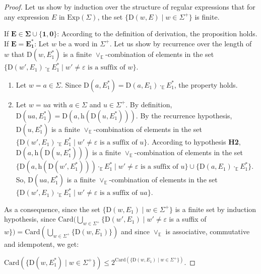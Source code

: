 \documentclass{article}
\begin{document}
  \begin{proof}  
    Let us show by induction over the structure of regular expressions that for any expression $E$ in $\mathrm{Exp}(\Sigma)$, the set $\{\mathrm{D}(w,E)\mid w\in\Sigma^{+}\}$ is finite.
    
    
     If  $\mathbf{E\in\Sigma\cup\{1,0\}}$:      
        According to the definition of derivation, the proposition holds. \\
           
           
       If $\mathbf{E=E_1^{*}}$:
        Let $w$ be a word in $\Sigma^{+}$. 
        Let us show by recurrence over the length of $w$ that $\mathrm{D}(w,E_1^{*})$ is a finite $\vee_{\mathbb{E}}$-combination of elements in the set $\{\mathrm{D}(w',E_1) \cdot_{\mathbb{E}} E_1^* \mid w'\neq\varepsilon\text{ is a suffix of }w\}$.
          \begin{enumerate}
            \item Let $w=a\in\Sigma$. Since $\mathrm{D}(a,E_1^{*})=\mathrm{D}(a,E_1) \cdot_{\mathbb{E}} E_1^*$, the property holds.
            \item Let $w=ua$ with $a\in\Sigma$ and $u\in\Sigma^{+}$. By definition, $\mathrm{D}(ua,E_1^{*})=\mathrm{D}(a,\mathrm{h}(\mathrm{D}(u,E_1^{*})))$. By the recurrence hypothesis, $\mathrm{D}(u,E_1^{*})$ is a finite $\vee_{\mathbb{E}}$-combination of elements in the set $\{\mathrm{D}(w',E_1) \cdot_{\mathbb{E}} E_1^* \mid w'\neq\varepsilon \text{ is a suffix of }u\}$. According to hypothesis \textbf{H2}, $\mathrm{D}(a,\mathrm{h}(\mathrm{D}(u,E_1^{*})))$ is a finite $\vee_{\mathbb{E}}$-combination of elements in the set $\{\mathrm{D}(a,\mathrm{h}(\mathrm{D}(w',E_1^{*}))) \cdot_{\mathbb{E}} E_1^*\mid w'\neq\varepsilon\text{ is a suffix of }u\}\cup \{\mathrm{D}(a,E_1) \cdot_{\mathbb{E}} E_1^* \}$. So, $\mathrm{D}(ua,E_1^{*})$ is a finite $\vee_{\mathbb{E}}$-combination of elements in the set $\{\mathrm{D}(w',E_1) \cdot_{\mathbb{E}} E_1^*\mid w'\neq\varepsilon\text{ is a suffix of }ua\}$.
          \end{enumerate}  
          
          
        As a consequence, since the set $\{\mathrm{D}(w,E_1)\mid w\in\Sigma^{+}\}$ is a finite set by induction hypothesis, since $\mathrm{Card}(\bigcup_{w\in\Sigma^+}\{\mathrm{D}(w',E_1)\mid w'\neq\varepsilon$ is a suffix of  $w\})=\mathrm{Card}(\bigcup_{w\in\Sigma^+}\{\mathrm{D}(w,E_1)\})$ and since $\vee_{\mathbb{E}}$ is associative, commutative and idempotent, we get:
          
          \centerline{
            $\mathrm{Card}(\{\mathrm{D}(w,E_1^{*})\mid w\in\Sigma^{+}\})\leq 2^{\mathrm{Card}(\{\mathrm{D}(w,E_1)\mid w\in\Sigma^{+}\})}$.
          } 
          

\end{proof}
\end{document}
